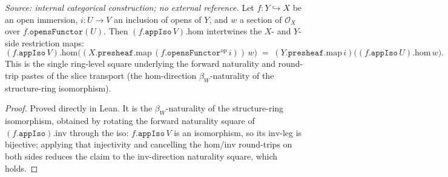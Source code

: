 \begin{lemma}\leanok
  \label{lem:appiso_hom_naturality_apply}
  \textit{Source: internal categorical construction; no external reference.}
  Let \(f : Y \hookrightarrow X\) be an open immersion, \(i : U \to V\) an inclusion of opens of
  \(Y\), and \(w\) a section of \(\mathcal{O}_X\) over \(f.\mathtt{opensFunctor}(U)\). Then
  \((f.\mathtt{appIso}\,V).\mathrm{hom}\) intertwines the \(X\)- and \(Y\)-side restriction maps:
  \[
    (f.\mathtt{appIso}\,V).\mathrm{hom}\bigl(
      (X.\mathtt{presheaf}.\mathrm{map}\,(f.\mathtt{opensFunctor}^{\mathrm{op}}\,i))\,w\bigr)
      \;=\;
    (Y.\mathtt{presheaf}.\mathrm{map}\,i)\bigl((f.\mathtt{appIso}\,U).\mathrm{hom}\,w\bigr).
  \]
  This is the single ring-level square underlying the forward naturality and round-trip pastes
  of the slice transport (the \(\mathrm{hom}\)-direction \(\beta_W\)-naturality of the
  structure-ring isomorphism).
\end{lemma}
\begin{proof}


\leanok
  Proved directly in Lean. It is the \(\beta_W\)-naturality of the structure-ring isomorphism,
  obtained by rotating the forward naturality square of \((f.\mathtt{appIso}).\mathrm{inv}\)
  through the iso: \(f.\mathtt{appIso}\,V\) is an isomorphism, so its \(\mathrm{inv}\)-leg is
  bijective; applying that injectivity and cancelling the \(\mathrm{hom}\)/\(\mathrm{inv}\)
  round-trips on both sides reduces the claim to the \(\mathrm{inv}\)-direction naturality
  square, which holds.
\end{proof}

